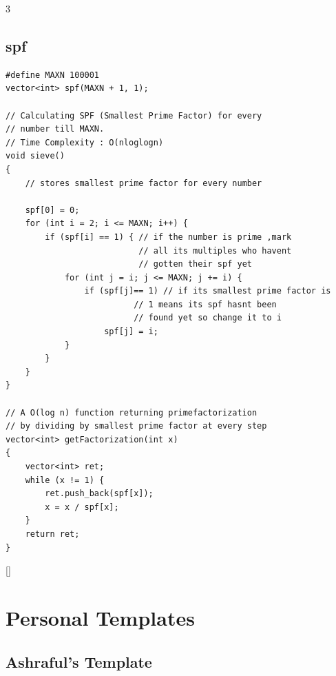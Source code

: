 \documentclass[twoside]{article}
\begin{document}
\begin{multicols*}{3}
{\subsection*{spf}
}
\begin{verbatim}
#define MAXN 100001
vector<int> spf(MAXN + 1, 1);

// Calculating SPF (Smallest Prime Factor) for every
// number till MAXN.
// Time Complexity : O(nloglogn)
void sieve()
{
    // stores smallest prime factor for every number

    spf[0] = 0;
    for (int i = 2; i <= MAXN; i++) {
        if (spf[i] == 1) { // if the number is prime ,mark
                           // all its multiples who havent
                           // gotten their spf yet
            for (int j = i; j <= MAXN; j += i) {
                if (spf[j]== 1) // if its smallest prime factor is
                          // 1 means its spf hasnt been
                          // found yet so change it to i
                    spf[j] = i;
            }
        }
    }
}

// A O(log n) function returning primefactorization
// by dividing by smallest prime factor at every step
vector<int> getFactorization(int x)
{
    vector<int> ret;
    while (x != 1) {
        ret.push_back(spf[x]);
        x = x / spf[x];
    }
    return ret;
}
\end{verbatim}

{
[\vspace{2em}]
\section*{Personal Templates}
}
{
\subsection*{Ashraful's Template}
}
\begin{verbatim}


\end{verbatim}
\end{multicols*}
\end{document}
